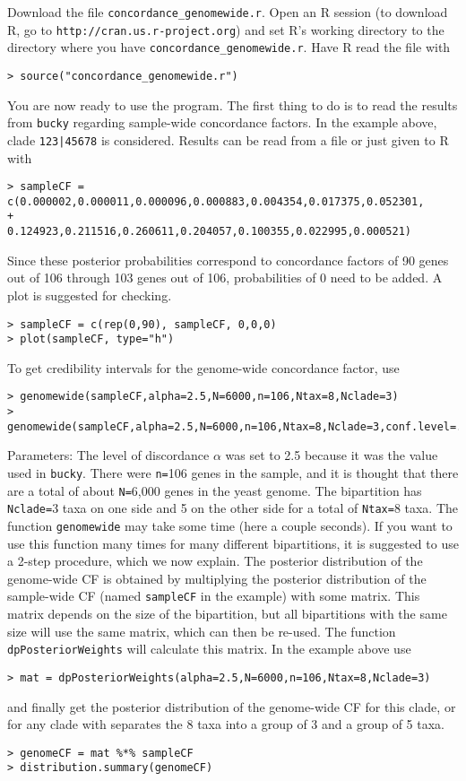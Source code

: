 \documentclass[12pt,english,final,letterpaper]{article}
\begin{document}
Download the file {\tt concordance\_genomewide.r}.
Open an R session (to download R, go to 
\verb+http://cran.us.r-project.org+) and set R's working directory to the
directory where you have {\tt concordance\_genomewide.r}. Have
R read the file with
\begin{verbatim}
> source("concordance_genomewide.r")
\end{verbatim}
You are now ready to use the program. The first thing to do is to read
the results from {\tt bucky} regarding sample-wide concordance factors.
In the example above, clade {\tt 123|45678} is considered. 
Results can be read from a file or just given to R with
\begin{verbatim}
> sampleCF = c(0.000002,0.000011,0.000096,0.000883,0.004354,0.017375,0.052301,
+              0.124923,0.211516,0.260611,0.204057,0.100355,0.022995,0.000521)
\end{verbatim}
Since these posterior probabilities correspond to concordance factors of
90 genes out of 106 through 103 genes out of 106, probabilities of 0 need
to be added. A plot is suggested for checking.
\begin{verbatim}
> sampleCF = c(rep(0,90), sampleCF, 0,0,0)
> plot(sampleCF, type="h")
\end{verbatim}
To get credibility intervals for the genome-wide concordance factor, use
\begin{verbatim}
> genomewide(sampleCF,alpha=2.5,N=6000,n=106,Ntax=8,Nclade=3)
> genomewide(sampleCF,alpha=2.5,N=6000,n=106,Ntax=8,Nclade=3,conf.level=.99)
\end{verbatim}
Parameters: The level of discordance
$\alpha$ was set to 2.5 because it was the value used in {\tt bucky}.
There were {\tt n=}106 genes in the sample, and it is thought that there are a 
total of about {\tt N=}6,000 genes in the yeast genome.
The bipartition has {\tt Nclade=}3 taxa on one side and 5 on the other side 
for a total of {\tt Ntax=}8 taxa.
The function {\tt genomewide} may take some time (here a couple seconds). 
If you want to use this function many times for many different bipartitions,
it is suggested to use a 2-step procedure, which we now explain.
The posterior distribution of the genome-wide CF 
is obtained by multiplying the posterior distribution of the sample-wide 
CF (named {\tt sampleCF} in the example) with some matrix.
This matrix depends on the size of the bipartition, but all bipartitions 
with the same size will use the same matrix, which can then be re-used. 
The function {\tt dpPosteriorWeights} will calculate this matrix.
In the example above use
\begin{verbatim}
> mat = dpPosteriorWeights(alpha=2.5,N=6000,n=106,Ntax=8,Nclade=3)
\end{verbatim}
and finally get the posterior distribution of the genome-wide CF for this
clade, or for any clade with separates the 8 taxa into a group of 3 and 
a group of 5 taxa.
\begin{verbatim}
> genomeCF = mat %*% sampleCF
> distribution.summary(genomeCF)
\end{verbatim}


\end{document}
